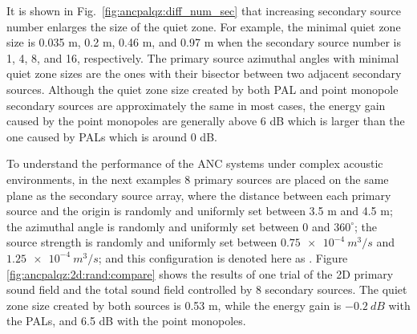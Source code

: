 It is shown in Fig.~\ref{fig:ancpalqz:diff_num_sec} that increasing secondary source number enlarges the size of the quiet zone. 
For example, the minimal quiet zone size is 0.035 m, 0.2 m, 0.46 m, and 0.97 m when the secondary source number is 1, 4, 8, and 16, respectively. 
The primary source azimuthal angles with minimal quiet zone sizes are the ones with their bisector between two adjacent secondary sources. 
Although the quiet zone size created by both PAL and point monopole secondary sources are approximately the same in most cases, 
the energy gain caused by the point monopoles are generally above 6 dB which is larger than the one caused by PALs which is around 0 dB.

To understand the performance of the ANC systems under complex acoustic environments, in the next examples 8 primary sources are placed on the same plane {as} the secondary source array, where the distance between each primary source and the origin is randomly and uniformly set between 3.5 m and 4.5 m; 
the azimuthal angle is randomly and uniformly set between 0 and $360^\circ$; 
the source strength is randomly and uniformly set between $\SI{0.75e-4}{m^3/s}$ and $\SI{1.25e-4}{m^3/s}$; 
and this configuration is denoted here as . 
Figure \ref{fig:ancpalqz:2d:rand:compare} shows the results of one trial of the 2D primary sound field and the total sound field controlled by 8 secondary sources. 
The quiet zone size created by both sources is 0.53 m, while the energy gain is $\SI{-0.2}{dB}$ with the PALs, and 6.5 dB with the point monopoles. 

